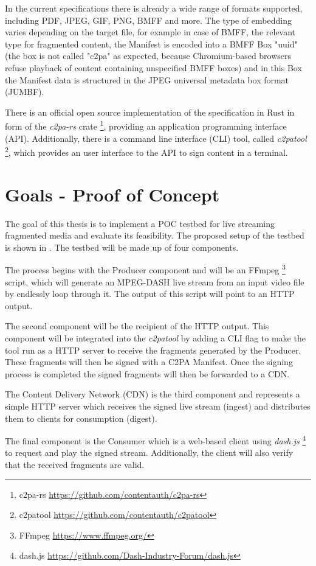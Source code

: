 \documentclass[a4paper]{article}
\begin{document}
In the current specifications there is already a wide range of formats supported, including PDF, JPEG, GIF, PNG, BMFF and more. The type of embedding varies depending on the target file, for example in case of BMFF, the relevant type for fragmented content, the Manifest is encoded into a BMFF Box "uuid" (the box is not called "c2pa" as expected, because Chromium-based browsers refuse playback of content containing unspecified BMFF boxes) and in this Box the Manifest data is structured in the JPEG universal metadata box format (JUMBF).

There is an official open source implementation of the specification in Rust in form of the \textit{c2pa-rs} crate \footnote{c2pa-rs \url{https://github.com/contentauth/c2pa-rs}}, providing an application programming interface (API). Additionally, there is a command line interface (CLI) tool, called \textit{c2patool} \footnote{c2patool \url{https://github.com/contentauth/c2patool}}, which provides an user interface to the API to sign content in a terminal.

\section{Goals - Proof of Concept}

The goal of this thesis is to implement a POC testbed for live streaming fragmented media and evaluate its feasibility. The proposed setup of the testbed is shown in . The testbed will be made up of four components. 

The process begins with the Producer component and will be an FFmpeg \footnote{FFmpeg \url{https://www.ffmpeg.org/}} script, which will generate an MPEG-DASH live stream from an input video file by endlessly loop through it. The output of this script will point to an HTTP output.

The second component will be the recipient of the HTTP output. This component will be integrated into the \textit{c2patool} by adding a CLI flag to make the tool run as a HTTP server to receive the fragments generated by the Producer. These fragments will then be signed with a C2PA Manifest. Once the signing process is completed the signed fragments will then be forwarded to a CDN.

The Content Delivery Network (CDN) is the third component and represents a simple HTTP server which receives the signed live stream (ingest) and distributes them to clients for consumption (digest).

The final component is the Consumer which is a web-based client using \textit{dash.js} \footnote{dash.js \url{https://github.com/Dash-Industry-Forum/dash.js}} to request and play the signed stream. Additionally, the client will also verify that the received fragments are valid.
\end{document}
